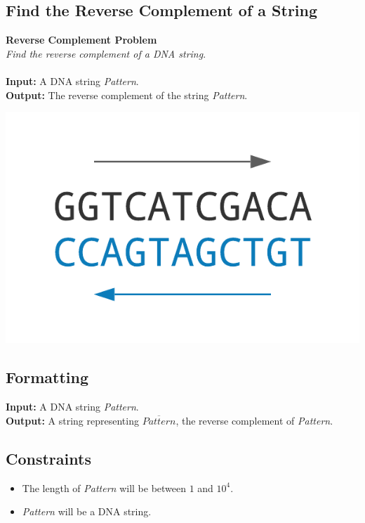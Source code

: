 \documentclass{article}
\begin{document}
\subsection{Find the Reverse Complement of a String}
\hline\vspace{5}
\noindent \textbf{Reverse Complement Problem}\\
\emph{Find the reverse complement of a DNA string}.\\ \\
\textbf{Input:} A DNA string \emph{Pattern}.\\
\textbf{Output:} The reverse complement of the string \emph{Pattern}.
\begin{center}
    \includegraphics[scale=0.24]{c1/logos/1C.png} 
\end{center}
\hline\vspace{5}

\subsection*{Formatting}
\textbf{Input:} A DNA string \emph{Pattern}.\\
\noindent \textbf{Output:} A string representing $\overline{Pattern}$, the reverse complement of \emph{Pattern}.

\subsection*{Constraints}
\begin{itemize}
    \item The length of \emph{Pattern} will be between $1$ and $10^4$.
    \item \emph{Pattern} will be a DNA string.
\end{itemize}
\pagebreak
\end{document}
